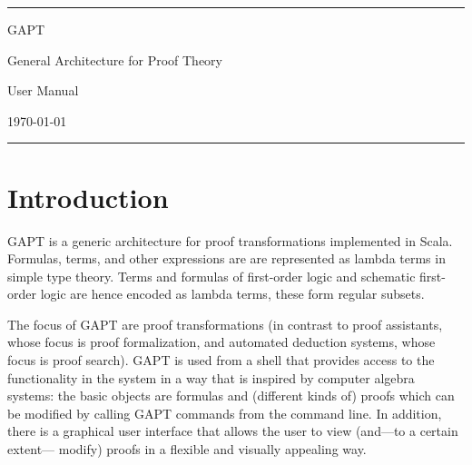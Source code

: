 \documentclass[a4paper,11pt]{article}
\begin{document}
\begin{titlepage}
\begin{center}

\hrule

\vspace*{20mm}

{\Huge GAPT}

\vspace*{5mm}

{\huge General Architecture for Proof Theory}

\vspace*{20mm}

{\Huge User Manual}

\vspace*{50mm}

{\Large \today}

\vspace*{20mm}


\vspace*{60mm}

\hrule
\end{center}



\end{titlepage}

\tableofcontents
\vfill
\pagebreak

\section{Introduction}

GAPT is a generic architecture for proof transformations implemented in Scala.
Formulas, terms, and other expressions are are represented as lambda terms in
simple type theory.  Terms and formulas of first-order logic and schematic
first-order logic are hence encoded as lambda terms, these form regular
subsets.

The focus of GAPT are proof transformations (in contrast to proof assistants,
whose focus is proof formalization, and automated deduction systems, whose focus
is proof search). GAPT is used from a shell that provides access to the functionality
in the system in a way that is inspired by computer algebra systems: the basic
objects are formulas and (different kinds of) proofs which can be modified
by calling GAPT commands from the command line. In addition, there
is a graphical user interface that allows the user to view (and—to a certain extent—
modify) proofs in a flexible and visually appealing way.
\end{document}
